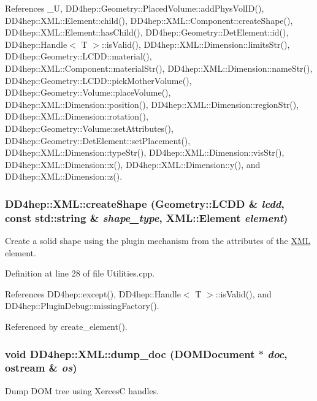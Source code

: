 References \_\-U, DD4hep::Geometry::PlacedVolume::addPhysVolID(), DD4hep::XML::Element::child(), DD4hep::XML::Component::createShape(), DD4hep::XML::Element::hasChild(), DD4hep::Geometry::DetElement::id(), DD4hep::Handle$<$ T $>$::isValid(), DD4hep::XML::Dimension::limitsStr(), DD4hep::Geometry::LCDD::material(), DD4hep::XML::Component::materialStr(), DD4hep::XML::Dimension::nameStr(), DD4hep::Geometry::LCDD::pickMotherVolume(), DD4hep::Geometry::Volume::placeVolume(), DD4hep::XML::Dimension::position(), DD4hep::XML::Dimension::regionStr(), DD4hep::XML::Dimension::rotation(), DD4hep::Geometry::Volume::setAttributes(), DD4hep::Geometry::DetElement::setPlacement(), DD4hep::XML::Dimension::typeStr(), DD4hep::XML::Dimension::visStr(), DD4hep::XML::Dimension::x(), DD4hep::XML::Dimension::y(), and DD4hep::XML::Dimension::z().\hypertarget{namespace_d_d4hep_1_1_x_m_l_a8ff2032ce30be011dde0b5696701605f}{
\subsubsection[{createShape}]{ DD4hep::XML::createShape (Geometry::LCDD \& {\em lcdd}, \/  const std::string \& {\em shape\_\-type}, \/  {\bf XML::Element} {\em element})}}
\label{namespace_d_d4hep_1_1_x_m_l_a8ff2032ce30be011dde0b5696701605f}


Create a solid shape using the plugin mechanism from the attributes of the \hyperlink{namespace_d_d4hep_1_1_x_m_l}{XML} element. 

Definition at line 28 of file Utilities.cpp.

References DD4hep::except(), DD4hep::Handle$<$ T $>$::isValid(), and DD4hep::PluginDebug::missingFactory().

Referenced by create\_\-element().\hypertarget{namespace_d_d4hep_1_1_x_m_l_ae465472cdddbe11a365f14b04b15b191}{
\subsubsection[{dump\_\-doc}]{\setlength{\rightskip}{0pt plus 5cm}void DD4hep::XML::dump\_\-doc (DOMDocument $\ast$ {\em doc}, \/  ostream \& {\em os})}}
\label{namespace_d_d4hep_1_1_x_m_l_ae465472cdddbe11a365f14b04b15b191}


Dump DOM tree using XercesC handles. 

